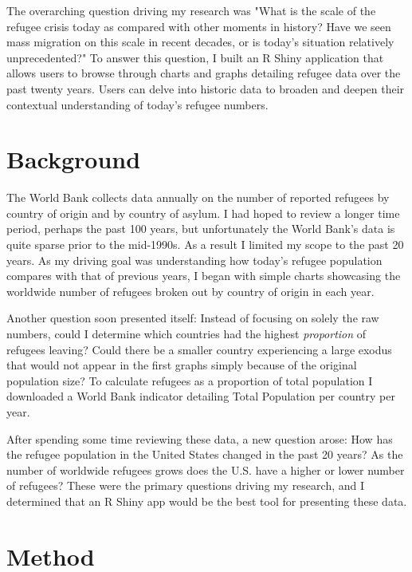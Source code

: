 \documentclass{article}
\begin{document}
\noindent The overarching question driving my research was "What is the scale of the refugee crisis today as compared with other moments in history? Have we seen mass migration on this scale in recent decades, or is today's situation relatively unprecedented?" To answer this question, I built an R Shiny application that allows users to browse through charts and graphs detailing refugee data over the past twenty years. Users can delve into historic data to broaden and deepen their contextual understanding of today’s refugee numbers.  

\section{Background}

The World Bank collects data annually on the number of reported refugees by country of origin and by country of asylum. I had hoped to review a longer time period, perhaps the past 100 years, but unfortunately the World Bank's data is quite sparse prior to the mid-1990s. As a result I limited my scope to the past 20 years. As my driving goal was understanding how today's refugee population compares with that of previous years, I began with simple charts showcasing the worldwide number of refugees broken out by country of origin in each year.\vspace{2mm}

\noindent
Another question soon presented itself: Instead of focusing on solely the raw numbers, could I determine which countries had the highest \emph{proportion} of refugees leaving? Could there be a smaller country experiencing a large exodus that would not appear in the first graphs simply because of the original population size? To calculate refugees as a proportion of total population I downloaded a World Bank indicator detailing Total Population per country per year.\vspace{2mm}

\noindent
After spending some time reviewing these data, a new question arose: How has the refugee population in the United States changed in the past 20 years? As the number of worldwide refugees grows does the U.S. have a higher or lower number of refugees?
These were the primary questions driving my research, and I determined that an R Shiny app would be the best tool for presenting these data.
\section{Method}
\end{document}
